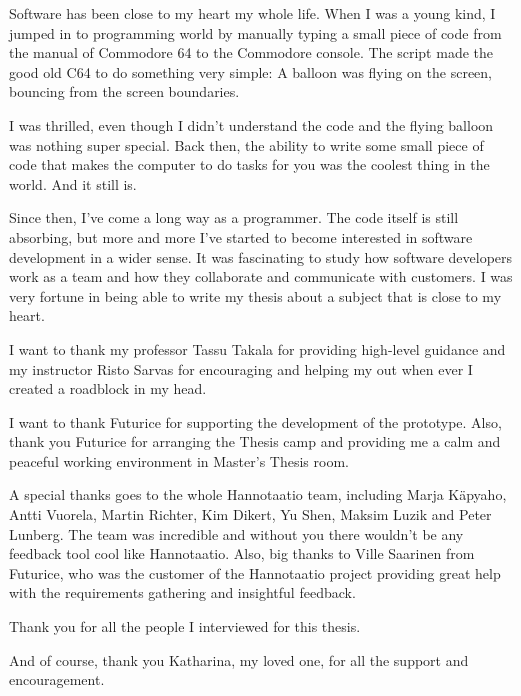 \documentclass[english,12pt,a4paper,pdftex]{article}
\begin{document}


Software has been close to my heart my whole life. When I was a young kind, I jumped in to programming world by manually typing a small piece of code from the manual of Commodore 64 to the Commodore console. The script made the good old C64 to do something very simple: A balloon was flying on the screen, bouncing from the screen boundaries. 

I was thrilled, even though I didn't understand the code and the flying balloon was nothing super special. Back then, the ability to write some small piece of code that makes the computer to do tasks for you was the coolest thing in the world. And it still is.

Since then, I've come a long way as a programmer. The code itself is still absorbing, but more and more I've started to become interested in software development in a wider sense. It was fascinating to study how software developers work as a team and how they collaborate and communicate with customers. I was very fortune in being able to write my thesis about a subject that is close to my heart.

I want to thank my professor Tassu Takala for providing high-level guidance and my instructor Risto Sarvas for  encouraging and helping my out when ever I created a roadblock in my head.

I want to thank Futurice for supporting the development of the prototype. Also, thank you Futurice for arranging the Thesis camp and providing me a calm and peaceful working environment in Master's Thesis room.

A special thanks goes to the whole Hannotaatio team, including Marja Käpyaho, Antti Vuorela, Martin Richter, Kim Dikert, Yu Shen, Maksim Luzik and Peter Lunberg. The team was incredible and without you there wouldn't be any feedback tool cool like Hannotaatio. Also, big thanks to Ville Saarinen from Futurice, who was the customer of the Hannotaatio project providing great help with the requirements gathering and insightful feedback.

Thank you for all the people I interviewed for this thesis.

And of course, thank you Katharina, my loved one, for all the support and encouragement.

\end{document}
